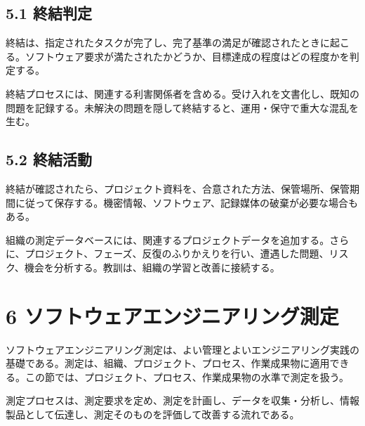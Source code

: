 \documentclass[a4paper,11pt]{ltjsarticle}
\begin{document}
\subsection{5.1 終結判定}
終結は、指定されたタスクが完了し、完了基準の満足が確認されたときに起こる。ソフトウェア要求が満たされたかどうか、目標達成の程度はどの程度かを判定する。

終結プロセスには、関連する利害関係者を含める。受け入れを文書化し、既知の問題を記録する。未解決の問題を隠して終結すると、運用・保守で重大な混乱を生む。

\subsection{5.2 終結活動}
終結が確認されたら、プロジェクト資料を、合意された方法、保管場所、保管期間に従って保存する。機密情報、ソフトウェア、記録媒体の破棄が必要な場合もある。

組織の測定データベースには、関連するプロジェクトデータを追加する。さらに、プロジェクト、フェーズ、反復のふりかえりを行い、遭遇した問題、リスク、機会を分析する。教訓は、組織の学習と改善に接続する。

\begin{center}
\end{center}

\section{6 ソフトウェアエンジニアリング測定}
ソフトウェアエンジニアリング測定は、よい管理とよいエンジニアリング実践の基礎である。測定は、組織、プロジェクト、プロセス、作業成果物に適用できる。この節では、プロジェクト、プロセス、作業成果物の水準で測定を扱う。

測定プロセスは、測定要求を定め、測定を計画し、データを収集・分析し、情報製品として伝達し、測定そのものを評価して改善する流れである。

\begin{center}
\end{center}
\end{document}

